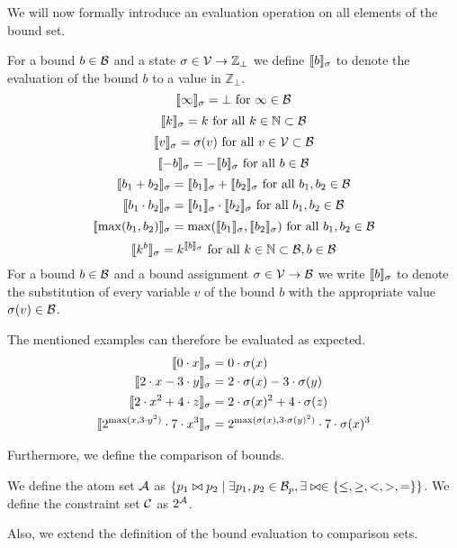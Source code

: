 We will now formally introduce an evaluation operation on all elements of the bound set.

\begin{definition}
  For a bound $b \in \mathcal{B}$ and a state $\sigma \in \mathcal{V} \rightarrow \mathbb{Z}_\bot$ we define $\llbracket b \rrbracket_{\sigma}$ to denote the evaluation of the bound $b$ to a value in $\mathbb{Z}_\bot$.
  \[ \llbracket \infty \rrbracket_{\sigma} = \bot \text{ for } \infty \in \mathcal{B} \] 
  \[ \llbracket k \rrbracket_{\sigma} = k \text{ for all } k \in \mathbb{N} \subset \mathcal{B} \] 
  \[ \llbracket v \rrbracket_{\sigma} = \sigma(v) \text{ for all } v \in \mathcal{V} \subset \mathcal{B} \] 
  \[ \llbracket -b \rrbracket_{\sigma} = -\llbracket b \rrbracket_{\sigma} \text{ for all } b \in \mathcal{B} \] 
  \[ \llbracket b_1 + b_2 \rrbracket_{\sigma} = \llbracket b_1 \rrbracket_{\sigma} + \llbracket b_2 \rrbracket_{\sigma} \text{ for all } b_1, b_2 \in \mathcal{B} \] 
  \[ \llbracket b_1 \cdot b_2 \rrbracket_{\sigma} = \llbracket b_1 \rrbracket_{\sigma} \cdot \llbracket b_2 \rrbracket_{\sigma} \text{ for all } b_1, b_2 \in \mathcal{B} \] 
  \[ \llbracket \max(b_1, b_2) \rrbracket_{\sigma} = \max(\llbracket b_1 \rrbracket_{\sigma}, \llbracket b_2 \rrbracket_{\sigma}) \text{ for all } b_1, b_2 \in \mathcal{B} \]
  \[ \llbracket k^b \rrbracket_{\sigma} = k^{\llbracket b \rrbracket_{\sigma}} \text{ for all } k \in \mathbb{N} \subset \mathcal{B}, b \in \mathcal{B} \]  
  For a bound $b \in \mathcal{B}$ and a bound assignment $\sigma \in \mathcal{V} \rightarrow \mathcal{B}$ we write $\llbracket b \rrbracket_{\sigma}$ to denote the substitution of every variable $v$ of the bound $b$ with the appropriate value $\sigma(v) \in \mathcal{B}$.
\end{definition}

The mentioned examples can therefore be evaluated as expected.
\begin{align*}
  \llbracket 0 \cdot x \rrbracket_{\sigma} &= 0 \cdot \sigma(x) \\
  \llbracket 2 \cdot x - 3 \cdot y \rrbracket_{\sigma} &= 2 \cdot \sigma(x) - 3 \cdot \sigma(y) \\
  \llbracket 2 \cdot x^2 + 4 \cdot z \rrbracket_{\sigma} &= 2 \cdot \sigma(x)^2 + 4 \cdot \sigma(z) \\
  \llbracket 2^{\max(x,3 \cdot y^2)} \cdot 7 \cdot x^3 \rrbracket_{\sigma} &= 2^{\max(\sigma(x),3 \cdot \sigma(y)^2)} \cdot 7 \cdot \sigma(x)^3 \\
\end{align*}

Furthermore, we define the comparison of bounds.

\begin{definition}
  We define the atom set $\mathcal{A}$ as $\lbrace p_1 \bowtie p_2 \mid \exists p_1, p_2 \in \mathcal{B}_p, \exists \bowtie \in \lbrace \leq, \geq, <, >, = \rbrace \rbrace$.
  We define the constraint set $\mathcal{C}$ as $2^{\mathcal{A}}$.
\end{definition}
Also, we extend the definition of the bound evaluation to comparison sets.

